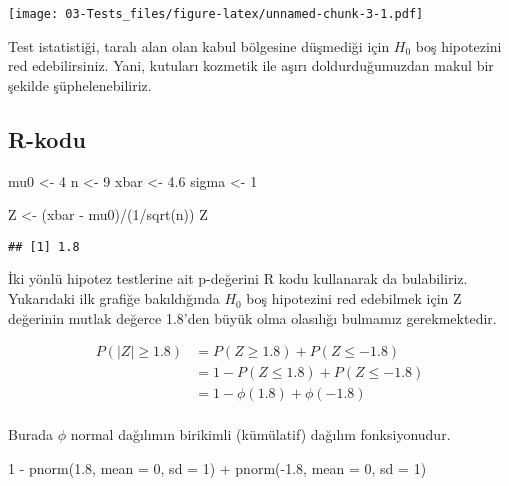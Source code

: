 \documentclass[
  12pt,
]{book}
\newenvironment{Shaded}{\begin{snugshade}}{\end{snugshade}}
\newcommand{\AttributeTok}[1]{\textcolor[rgb]{0.77,0.63,0.00}{#1}}
\newcommand{\DecValTok}[1]{\textcolor[rgb]{0.00,0.00,0.81}{#1}}
\newcommand{\FloatTok}[1]{\textcolor[rgb]{0.00,0.00,0.81}{#1}}
\newcommand{\FunctionTok}[1]{\textcolor[rgb]{0.00,0.00,0.00}{#1}}
\newcommand{\NormalTok}[1]{#1}
\newcommand{\OtherTok}[1]{\textcolor[rgb]{0.56,0.35,0.01}{#1}}
\newcommand{\SpecialCharTok}[1]{\textcolor[rgb]{0.00,0.00,0.00}{#1}}
\begin{document}
\texttt{[image: 03-Tests\_files/figure-latex/unnamed-chunk-3-1.pdf]}

Test istatistiği, taralı alan olan kabul bölgesine düşmediği için \(H_{0}\) boş hipotezini red edebilirsiniz. Yani, kutuları kozmetik ile aşırı doldurduğumuzdan makul bir şekilde şüphelenebiliriz.

\hypertarget{r-kodu}{%
\subsection{R-kodu}\label{r-kodu}}

\begin{Shaded}
\begin{Highlighting}[]
\NormalTok{mu0 }\OtherTok{\textless{}{-}} \DecValTok{4}
\NormalTok{n }\OtherTok{\textless{}{-}} \DecValTok{9}
\NormalTok{xbar }\OtherTok{\textless{}{-}} \FloatTok{4.6}
\NormalTok{sigma }\OtherTok{\textless{}{-}} \DecValTok{1}

\NormalTok{Z }\OtherTok{\textless{}{-}}\NormalTok{ (xbar }\SpecialCharTok{{-}}\NormalTok{ mu0)}\SpecialCharTok{/}\NormalTok{(}\DecValTok{1}\SpecialCharTok{/}\FunctionTok{sqrt}\NormalTok{(n))}
\NormalTok{Z}
\end{Highlighting}
\end{Shaded}

\begin{verbatim}
## [1] 1.8
\end{verbatim}

İki yönlü hipotez testlerine ait p-değerini R kodu kullanarak da bulabiliriz. Yukarıdaki ilk grafiğe bakıldığında \(H_{0}\) boş hipotezini red edebilmek için Z değerinin mutlak değerce 1.8'den büyük olma olasılığı bulmamız gerekmektedir.

\begin{equation}
\begin{split}
P \left( |Z| \geq 1.8 \right) &= P(Z \geq 1.8) + P(Z \leq -1.8) \\
&= 1 - P(Z \leq 1.8) + P(Z \leq -1.8) \\
&= 1 - \phi(1.8) +\phi(-1.8)\\
\end{split}
\end{equation}

Burada \(\phi\) normal dağılımın birikimli (kümülatif) dağılım fonksiyonudur.

\begin{Shaded}
\begin{Highlighting}[]
\DecValTok{1} \SpecialCharTok{{-}} \FunctionTok{pnorm}\NormalTok{(}\FloatTok{1.8}\NormalTok{, }\AttributeTok{mean =} \DecValTok{0}\NormalTok{, }\AttributeTok{sd =} \DecValTok{1}\NormalTok{) }\SpecialCharTok{+} \FunctionTok{pnorm}\NormalTok{(}\SpecialCharTok{{-}}\FloatTok{1.8}\NormalTok{, }\AttributeTok{mean =} \DecValTok{0}\NormalTok{, }\AttributeTok{sd =} \DecValTok{1}\NormalTok{)}
\end{Highlighting}
\end{Shaded}
\end{document}
